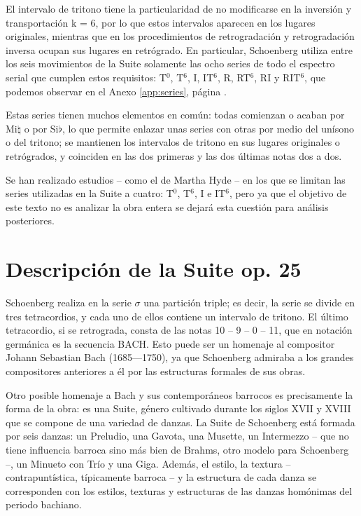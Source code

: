 		El intervalo de tritono tiene la particularidad de no modificarse en la inversión y transportación k = 6, por lo que estos intervalos aparecen en los lugares originales, mientras que en los procedimientos de retrogradación y retrogradación inversa ocupan sus lugares en retrógrado. En particular, Schoenberg utiliza entre los seis movimientos de la Suite solamente las ocho series de todo el espectro serial que cumplen estos requisitos: T$^0$, T$^6$, I, IT$^6$, R, RT$^6$, RI y RIT$^6$, que podemos observar en el Anexo \ref{app:series}, página \pageref{app:series}.
		
		Estas series tienen muchos elementos en común: todas comienzan o acaban por Mi$\natural$ o por Si$\flat$, lo que permite enlazar unas series con otras por medio del unísono o del tritono; se mantienen los intervalos de tritono en sus lugares originales o retrógrados, y coinciden en las dos primeras y las dos últimas notas dos a dos.
		
		Se han realizado estudios -- como el de Martha Hyde \cite{hyde} -- en los que se limitan las series utilizadas en la Suite a cuatro: T$^0$, T$^6$, I e IT$^6$, pero ya que el objetivo de este texto no es analizar la obra entera se dejará esta cuestión para análisis posteriores.
		
	\section{Descripción de la Suite op. 25}
		Schoenberg realiza en la serie $\sigma$ una partición triple; es decir, la serie se divide en tres tetracordios, y cada uno de ellos contiene un intervalo de tritono. El último tetracordio, si se retrograda, consta de las notas 10 -- 9 -- 0 -- 11, que en notación germánica es la secuencia BACH. Esto puede ser un homenaje al compositor Johann Sebastian Bach (1685—1750), ya que Schoenberg admiraba a los grandes compositores anteriores a él por las estructuras formales de sus obras. \cite{xiao}
		
		Otro posible homenaje a Bach y sus contemporáneos barrocos es precisamente la forma de la obra: es una Suite, género cultivado durante los siglos XVII y XVIII que se compone de una variedad de danzas. La Suite de Schoenberg está formada por seis danzas: un Preludio, una Gavota, una Musette, un Intermezzo -- que no tiene influencia barroca sino más bien de Brahms, otro modelo para Schoenberg --, un Minueto con Trío y una Giga. Además, el estilo, la textura -- contrapuntística, típicamente barroca -- y la estructura de cada danza se corresponden con los estilos, texturas y estructuras de las danzas homónimas del periodo bachiano.
        
